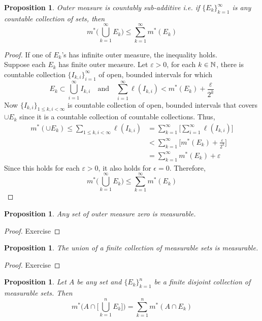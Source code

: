 \documentclass[	DIV=calc,paper=a4,fontsize=11pt]{scrartcl}	 	%
\newtheorem{prop}[thm]{Proposition}
\theoremstyle{definition}
\theoremstyle{plain}
\theoremstyle{remark}
\begin{document}
\begin{prop}
Outer measure is countably sub-additive i.e. if $\{E_k\}_{k=1}^{\infty}$ is any countable collection of sets, then
\[m^*\biggl(\bigcup_{k=1}^{\infty}E_k\biggl)\leq \sum_{k=1}^{\infty}m^*(E_k)\]
\end{prop}
\begin{proof}
If one of $E_k$'s has infinite outer measure, the inequality holds.\\ Suppose each $E_k$ has finite outer measure. Let $\varepsilon>0$, for each $k\in \Bbb N$, there is countable collection $\{I_{k,i}\}_{i=1}^{\infty}$ of open, bounded intervals for which
\[E_k\subset \bigcup_{i=1}^{\infty}I_{k,i}\quad\text{and}\quad \sum_{i=1}^{\infty}\ell(I_{k,i})<m^*(E_k)+\frac{\varepsilon}{2^k}\]
Now $\{I_{k,i}\}_{1\leq k,i<\infty}$ is countable collection of open, bounded intervals that covers $\cup E_k$ since it is a countable collection of countable collections. Thus,
\begin{align*}
m^*(\cup E_k)\leq \sum_{1\leq k,i< \infty} \ell(I_{k,i})&=\sum_{k=1}^{\infty}\biggl[\sum_{i=1}^{\infty}\ell(I_{k,i})\biggl]\\
&<\sum_{k=1}^{\infty}\biggl[m^*(E_k)+\frac{\varepsilon}{2^k}\biggl]\\
&=\sum_{k=1}^{\infty}m^*(E_k)+\varepsilon
\end{align*}
Since this holds for each $\varepsilon>0$, it also holds for $\epsilon=0$. Therefore,
\[m^*\biggl(\bigcup_{k=1}^{\infty}E_k\biggl)\leq \sum_{k=1}^{\infty}m^*(E_k)\]
\end{proof}

\begin{prop}
Any set of outer measure zero is measurable.
\end{prop}

\begin{proof}
Exercise
\end{proof}

\begin{prop}
The union of a finite collection of measurable sets is measurable.
\end{prop}

\begin{proof}
Exercise
\end{proof}

\begin{prop}
Let $A$ be any set and $\{E_k\}_{k=1}^n$ be a finite disjoint collection of measurable sets. Then
\[m^*\biggl(A\cap\biggl[\bigcup_{k=1}^{n}E_k\biggl]\biggl)=\sum_{k=1}^{n}m^*(A\cap E_k)\]
\end{prop}
\end{document}
